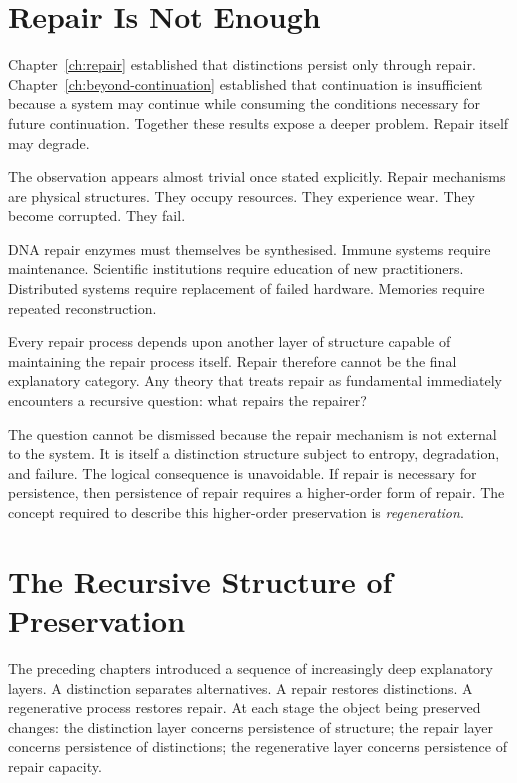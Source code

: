 \documentclass[12pt,twoside,openright]{book}
\begin{document}
\section{Repair Is Not Enough}
\label{sec:ch11-not-enough}

Chapter~\ref{ch:repair} established that distinctions
persist only through repair. Chapter~\ref{ch:beyond-continuation}
established that continuation is insufficient because a
system may continue while consuming the conditions
necessary for future continuation. Together these results
expose a deeper problem. Repair itself may degrade.

The observation appears almost trivial once stated
explicitly. Repair mechanisms are physical structures. They
occupy resources. They experience wear. They become
corrupted. They fail.

DNA repair enzymes must themselves be synthesised. Immune
systems require maintenance. Scientific institutions
require education of new practitioners. Distributed systems
require replacement of failed hardware. Memories require
repeated reconstruction.

Every repair process depends upon another layer of
structure capable of maintaining the repair process itself.
Repair therefore cannot be the final explanatory category.
Any theory that treats repair as fundamental immediately
encounters a recursive question: what repairs the repairer?

The question cannot be dismissed because the repair
mechanism is not external to the system. It is itself a
distinction structure subject to entropy, degradation, and
failure. The logical consequence is unavoidable. If repair
is necessary for persistence, then persistence of repair
requires a higher-order form of repair. The concept
required to describe this higher-order preservation is
\emph{regeneration}.

\section{The Recursive Structure of Preservation}
\label{sec:ch11-recursive}

The preceding chapters introduced a sequence of
increasingly deep explanatory layers. A distinction
separates alternatives. A repair restores distinctions. A
regenerative process restores repair. At each stage the
object being preserved changes: the distinction layer
concerns persistence of structure; the repair layer
concerns persistence of distinctions; the regenerative
layer concerns persistence of repair capacity.
\end{document}
